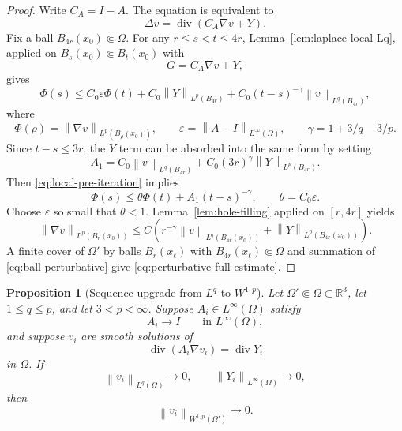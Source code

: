 \documentclass[11pt]{amsart}
\numberwithin{equation}{section}
\newtheorem{proposition}[theorem]{Proposition}
\theoremstyle{definition}
\newcommand{\R}{\mathbb R}
\newcommand{\eps}{\varepsilon}
\newcommand{\divE}{\operatorname{div}}
\newcommand{\norm}[1]{\left\lVert #1\right\rVert}
\begin{document}
\begin{proof}
Write $C_A=I-A$.  The equation is equivalent to
\begin{equation}\label{eq:laplace-perturbed}
        \Delta v=\divE(C_A\nabla v+Y).
\end{equation}
Fix a ball $B_{4r}(x_0)\Subset\Omega$.  For any $r\le s<t\le4r$, Lemma~\ref{lem:laplace-local-Lq}, applied on $B_s(x_0)\Subset B_t(x_0)$ with
$$
        G=C_A\nabla v+Y,
$$
gives
\begin{equation}\label{eq:local-pre-iteration}
        \Phi(s)
        \le C_0\eps\Phi(t)
        +C_0\norm{Y}_{L^p(B_{4r})}
        +C_0(t-s)^{-\gamma}\norm{v}_{L^q(B_{4r})},
\end{equation}
where
$$
        \Phi(\rho)=\norm{\nabla v}_{L^p(B_\rho(x_0))},
        \qquad
        \eps=\norm{A-I}_{L^\infty(\Omega)},
        \qquad
        \gamma=1+3/q-3/p.
$$
Since $t-s\le3r$, the $Y$ term can be absorbed into the same form by setting
$$
        A_1=C_0\norm{v}_{L^q(B_{4r})}+C_0(3r)^\gamma\norm{Y}_{L^p(B_{4r})}.
$$
Then \eqref{eq:local-pre-iteration} implies
$$
        \Phi(s)\le \theta\Phi(t)+A_1(t-s)^{-\gamma},
        \qquad \theta=C_0\eps.
$$
Choose $\eps$ so small that $\theta<1$.  Lemma~\ref{lem:hole-filling} applied on $[r,4r]$ yields
\begin{equation}\label{eq:ball-perturbative}
        \norm{\nabla v}_{L^p(B_r(x_0))}
        \le C\left(r^{-\gamma}\norm{v}_{L^q(B_{4r}(x_0))}
        +\norm{Y}_{L^p(B_{4r}(x_0))}\right).
\end{equation}
A finite cover of $\Omega'$ by balls $B_r(x_\ell)$ with $B_{4r}(x_\ell)\Subset\Omega$ and summation of \eqref{eq:ball-perturbative} give \eqref{eq:perturbative-full-estimate}.
\end{proof}

\begin{proposition}[Sequence upgrade from $L^q$ to $W^{1,p}$]\label{prop:elliptic-sequence}
Let $\Omega'\Subset\Omega\subset\R^3$, let $1\le q\le p$, and let $3<p<\infty$.  Suppose $A_i\in L^\infty(\Omega)$ satisfy
$$
        A_i\to I\qquad\text{in }L^\infty(\Omega),
$$
and suppose $v_i$ are smooth solutions of
$$
        \divE(A_i\nabla v_i)=\divE Y_i
$$
in $\Omega$.  If
$$
        \norm{v_i}_{L^q(\Omega)}\to0,
        \qquad
        \norm{Y_i}_{L^\infty(\Omega)}\to0,
$$
then
\begin{equation}\label{eq:sequence-upgrade-conclusion}
        \norm{v_i}_{W^{1,p}(\Omega')}\to0.
\end{equation}
\end{proposition}
\end{document}
